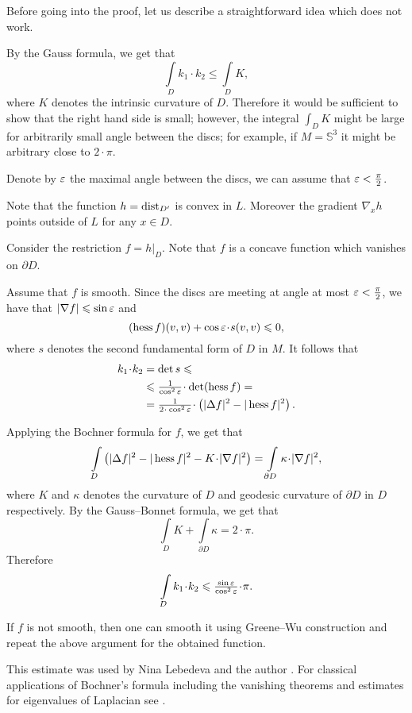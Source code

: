 Before going into the proof, let us describe a straightforward idea which does not work.

By the Gauss formula, we get that 
\[\int\limits_{D}k_1\cdot k_2\le\int\limits_{D}K,\] 
where $K$ denotes the intrinsic curvature of $D$.
Therefore it would be sufficient to show that the right hand side is small;
however, the integral $\int_{D}K$ might be large for arbitrarily small angle between the discs; for example, if $M=\mathbb{S}^3$ it might be arbitrary close to $2\cdot \pi$.

\medskip

Denote by $\varepsilon$ the maximal angle between the discs, we can assume that $\varepsilon<\tfrac\pi2$.

Note that the function $h=\operatorname{\rm dist}\nolimits_{D'}$ is convex in $L$.
Moreover the gradient $\nabla_xh$ points outside of $L$ for any $x\in D$. 

Consider the restriction $f=h|_D$.
Note that $f$ is a concave function which vanishes on $\partial D$.

Assume that $f$ is smooth.
Since the discs are meeting at angle at most $\varepsilon<\tfrac\pi2$,
we have that $|\nabla f|\leqslant \sin\varepsilon$ and 
\[(\Hess f)(v,v)+ \cos\eps \cdot s(v,v)\le 0,\]
where $s$ denotes the second fundamental form of $D$ in $M$.
It follows that
\begin{align*}
k_1\cdot k_2&=\det s\le
\\
&\le \tfrac1{\cos^2\eps}\cdot \det(\Hess f)=
\\
&=\tfrac1{2\cdot\cos^2\eps}\cdot\left(|\Delta f|^2
-|\Hess f|^2\right).
\end{align*}


Applying the Bochner formula for $f$, we get that
\[\int\limits_D \left(|\Delta f|^2
-|\Hess f|^2
-K\cdot|\nabla f|^2\right)
=\int\limits_{\partial D}
\kappa\cdot|\nabla f|^2,\]
where $K$ and $\kappa$ denotes the curvature of $D$ and geodesic curvature of $\partial D$ in $D$ respectively.
By the Gauss--Bonnet formula, we get that
\[\int\limits_D 
K+\int\limits_{\partial D}\kappa=2\cdot\pi.\]
Therefore
\[\int\limits_Dk_1\cdot k_2\le \tfrac{\sin \eps}{\cos^2\eps}\cdot\pi.\]

If $f$ is not smooth, then one can smooth it using Greene--Wu construction \cite[Theorem~2]{greene-wu} and repeat the above argument for the obtained function.
\qedsf

This estimate was used by Nina Lebedeva and the author \cite{lebedeva-petrunin-curvature}.
For classical applications of Bochner's formula including the vanishing theorems and estimates for eigenvalues of Laplacian see \cite[][II \S 8 in]{lawson-michelsohn}.

